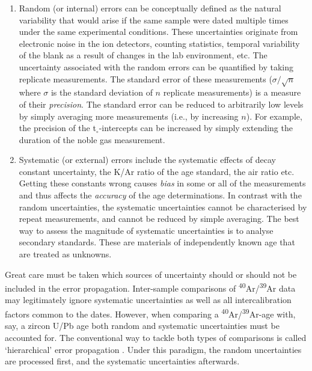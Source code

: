 \documentclass{article}
\begin{document}
\begin{enumerate}
  \item Random (or internal) errors can be conceptually defined as the
    natural variability that would arise if the same sample were dated
    multiple times under the same experimental conditions. These
    uncertainties originate from electronic noise in the ion
    detectors, counting statistics, temporal variability of the blank
    as a result of changes in the lab environment, etc. The
    uncertainty associated with the random errors can be quantified by
    taking replicate measurements. The standard error of these
    measurements ($\sigma/\sqrt{n}$ where $\sigma$ is the standard
    deviation of $n$ replicate measurements) is a measure of their
    \emph{precision}. The standard error can be reduced to arbitrarily
    low levels by simply averaging more measurements (i.e., by
    increasing $n$). For example, the precision of the
    t$_\circ$-intercepts can be increased by simply extending the
    duration of the noble gas measurement.
  \item Systematic (or external) errors include the systematic effects
    of decay constant uncertainty, the K/Ar ratio of the age standard,
    the air ratio etc. Getting these constants wrong causes
    \emph{bias} in some or all of the measurements and thus affects
    the \emph{accuracy} of the age determinations. In contrast with
    the random uncertainties, the systematic uncertainties cannot be
    characterised by repeat measurements, and cannot be reduced by
    simple averaging. The best way to assess the magnitude of
    systematic uncertainties is to analyse secondary standards.  These
    are materials of independently known age that are treated as
    unknowns.
\end{enumerate}

Great care must be taken which sources of uncertainty should or should
not be included in the error propagation.  Inter-sample comparisons of
\textsuperscript{40}Ar/\textsuperscript{39}Ar data may legitimately
ignore systematic uncertainties as well as all intercalibration
factors common to the dates. However, when comparing a
\textsuperscript{40}Ar/\textsuperscript{39}Ar-age with, say, a zircon
U/Pb age both random and systematic uncertainties must be accounted
for. The conventional way to tackle both types of comparisons is
called `hierarchical' error propagation \citep{renne1998, min2000}.
Under this paradigm, the random uncertainties are processed first, and
the systematic uncertainties afterwards.\\
\end{document}
